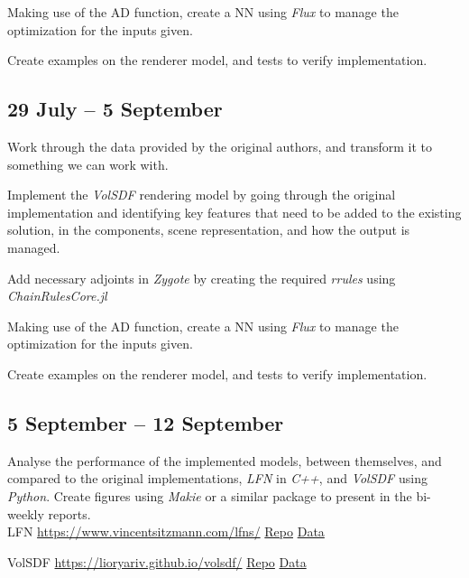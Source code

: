 Making use of the AD function, create a NN using \textit{Flux} to manage the optimization for the inputs given.

Create examples on the renderer model, and tests to verify implementation.

\subsection*{29 July -- 5 September}

Work through the data provided by the original authors, and transform it to something we can work with.

Implement the \textit{VolSDF} rendering model by going through the original implementation and identifying key features that need to be added to the existing solution, in the components, scene representation, and how the output is managed.

Add necessary adjoints in \textit{Zygote} by creating the required \textit{rrules} using \textit{ChainRulesCore.jl}

Making use of the AD function, create a NN using \textit{Flux} to manage the optimization for the inputs given.

Create examples on the renderer model, and tests to verify implementation.

\subsection*{5 September -- 12 September}

Analyse the performance of the implemented models, between themselves, and compared to the original implementations, \textit{LFN} in \textit{C++}, and \textit{VolSDF} using \textit{Python}. Create figures using \textit{Makie} or a similar package to present in the bi-weekly reports. \\

LFN \url{https://www.vincentsitzmann.com/lfns/} \href{https://github.com/vsitzmann/light-field-networks}{Repo} \href{https://drive.google.com/drive/folders/15u6WD0zSBXzu8jZBF-Sn5n01F2HSxFCp}{Data}

VolSDF \url{https://lioryariv.github.io/volsdf/} \href{https://github.com/lioryariv/volsdf}{Repo} \href{https://www.dropbox.com/sh/oum8dyo19jqdkwu/AAAxpIifYjjotz_fIRBj1Fyla}{Data}


